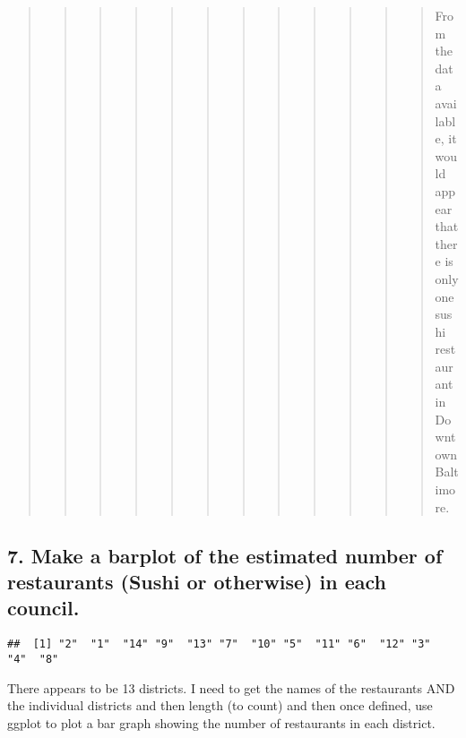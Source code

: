 \documentclass[
]{article}
\newenvironment{Shaded}{\begin{snugshade}}{\end{snugshade}}
\newcommand{\FunctionTok}[1]{\textcolor[rgb]{0.00,0.00,0.00}{#1}}
\newcommand{\NormalTok}[1]{#1}
\newcommand{\SpecialCharTok}[1]{\textcolor[rgb]{0.00,0.00,0.00}{#1}}
\begin{document}
\begin{quote}
\begin{quote}
\begin{quote}
\begin{quote}
\begin{quote}
\begin{quote}
\begin{quote}
\begin{quote}
\begin{quote}
\begin{quote}
\begin{quote}
\begin{quote}
From the data available, it would appear that there is only one sushi
restaurant in Downtown Baltimore.
\end{quote}
\end{quote}
\end{quote}
\end{quote}
\end{quote}
\end{quote}
\end{quote}
\end{quote}
\end{quote}
\end{quote}
\end{quote}
\end{quote}

\hypertarget{make-a-barplot-of-the-estimated-number-of-restaurants-sushi-or-otherwise-in-each-council.}{%
\subsection{7. Make a barplot of the estimated number of restaurants
(Sushi or otherwise) in each
council.}\label{make-a-barplot-of-the-estimated-number-of-restaurants-sushi-or-otherwise-in-each-council.}}

\begin{Shaded}
\end{Shaded}

\begin{verbatim}
##  [1] "2"  "1"  "14" "9"  "13" "7"  "10" "5"  "11" "6"  "12" "3"  "4"  "8"
\end{verbatim}

There appears to be 13 districts. I need to get the names of the
restaurants AND the individual districts and then length (to count) and
then once defined, use ggplot to plot a bar graph showing the number of
restaurants in each district.
\end{document}
